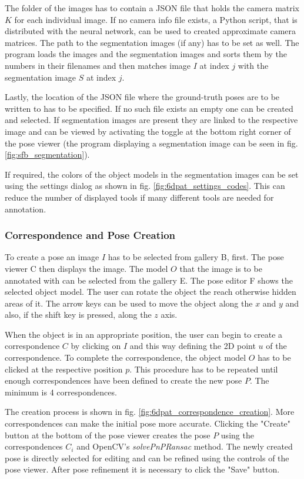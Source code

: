 The folder of the images has to contain a JSON file that holds the camera matrix $K$ for each individual image. If no camera info file exists, a Python script, that is distributed with the neural network, can be used to created approximate camera matrices. The path to the segmentation images (if any) has to be set as well. The program loads the images and the segmentation images and sorts them by the numbers in their filenames and then matches image $I$ at index $j$ with the segmentation image $S$ at index $j$. 

Lastly, the location of the JSON file where the ground-truth poses are to be written to has to be specified. If no such file exists an empty one can be created and selected. If segmentation images are present they are linked to the respective image and can be viewed by activating the toggle at the bottom right corner of the pose viewer (the program displaying a segmentation image can be seen in fig. \ref{fig:sfb_segmentation}). 

If required, the colors of the object models in the segmentation images can be set using the settings dialog as shown in fig. \ref{fig:6dpat_settings_codes}. This can reduce the number of displayed tools if many different tools are needed for annotation.

\subsubsection{Correspondence and Pose Creation} \label{subsection:correspondence_and_pose_creation}

To create a pose an image $I$ has to be selected from gallery B, first. The pose viewer C then displays the image. The model $O$ that the image is to be annotated with can be selected from the gallery E. The pose editor F shows the selected object model. The user can rotate the object the reach otherwise hidden areas of it. The arrow keys can be used to move the object along the $x$ and $y$ and also, if the shift key is pressed, along the $z$ axis. 

When the object is in an appropriate position, the user can begin to create a correspondence $C$ by clicking on $I$ and this way defining the 2D point $u$ of the correspondence. To complete the correspondence, the object model $O$ has to be clicked at the respective position $p$. This procedure has to be repeated until enough correspondences have been defined to create the new pose $P$. The minimum is 4 correspondences. 

The creation process is shown in fig. \ref{fig:6dpat_correspondence_creation}. More correspondences can make the initial pose more accurate. Clicking the "Create" button at the bottom of the pose viewer creates the pose $P$ using the correspondences $C_i$ and OpenCV's \textit{solvePnPRansac} method. The newly created pose is directly selected for editing and can be refined using the controls of the pose viewer. After pose refinement it is necessary to click the "Save" button. 

